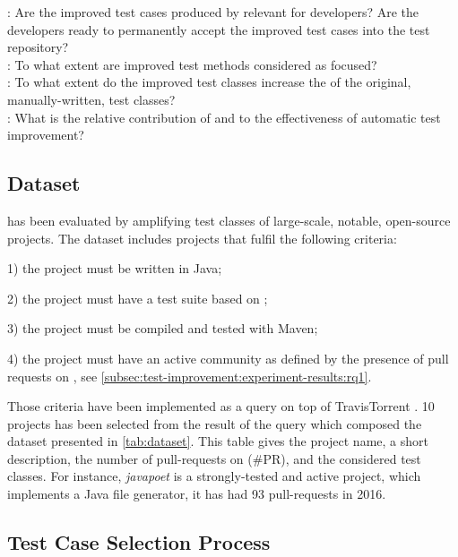 \noindent\textbf{\rqpullrequest}: Are the improved test cases produced by \dspot relevant for developers? Are the developers ready to permanently accept the improved test cases into the test repository?\\
\textbf{\rqcandidates}: To what extent are improved test methods considered as focused?\\
\textbf{\rqeffectiveness}: To what extent do the improved test classes increase the \ms of the original,  manually-written, test classes?\\
\textbf{\rqAmplVersusIAmpl}: What is the relative contribution of \Iampl{} and \Aampl{} to the effectiveness of automatic test improvement?\\

\subsection{Dataset}
\label{subsec:test-improvement:experiment-protocol:dataset}

\dspot has been evaluated by amplifying test classes of large-scale, notable, open-source projects. 
The dataset includes projects that fulfil the following criteria:

1) the project must be written in Java; 

2) the project must have a test suite based on \junit;

3) the project must be compiled and tested with Maven;

4) the project must have an active community as defined by the presence of pull requests on \gh, see \autoref{subsec:test-improvement:experiment-results:rq1}. 



Those criteria have been implemented as a query on top of TravisTorrent \cite{msr17challenge}. 
10 projects has been selected from the result of the query which composed the dataset presented in \autoref{tab:dataset}.
This table gives the project name, a short description, the number of pull-requests on \gh (\#PR), and the considered test classes.
For instance, \emph{javapoet} is a strongly-tested and active project, which implements a Java file generator, it has had 93 pull-requests in 2016.


\subsection{Test Case Selection Process}
\label{subsec:test-improvement:experiment-protocol:test-preparation}

